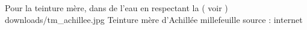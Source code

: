 {%
    Pour la teinture mère,  dans de l'eau en respectant la  ( voir  )
}
{%
    downloads/tm_achillee.jpg
}
{%
   Teinture mère d'Achillée millefeuille
}
{%
    source : internet
}